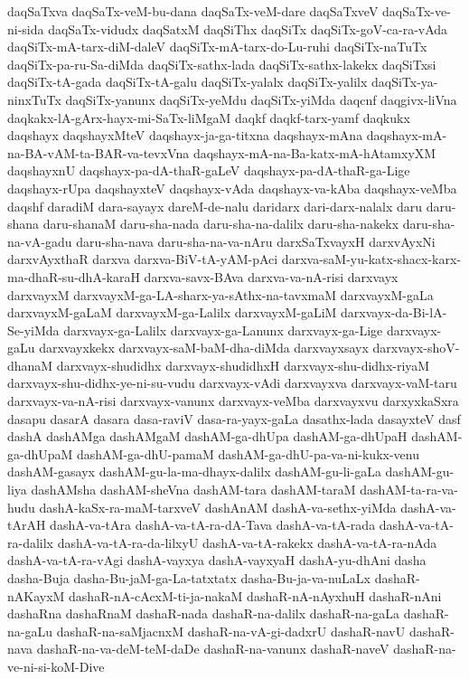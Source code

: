 {daqSaTxva
daqSaTx-veM-bu-dana
daqSaTx-veM-dare
daqSaTxveV
daqSaTx-ve-ni-sida
daqSaTx-vidudx
daqSatxM
daqSiThx
daqSiTx
daqSiTx-goV-ca-ra-vAda
daqSiTx-mA-tarx-diM-daleV
daqSiTx-mA-tarx-do-Lu-ruhi
daqSiTx-naTuTx
daqSiTx-pa-ru-Sa-diMda
daqSiTx-sathx-lada
daqSiTx-sathx-lakekx
daqSiTxsi
daqSiTx-tA-gada
daqSiTx-tA-galu
daqSiTx-yalalx
daqSiTx-yalilx
daqSiTx-ya-ninxTuTx
daqSiTx-yanunx
daqSiTx-yeMdu
daqSiTx-yiMda
daqcnf
daqgivx-liVna
daqkakx-lA-gArx-hayx-mi-SaTx-liMgaM
daqkf
daqkf-tarx-yamf
daqkukx
daqshayx
daqshayxMteV
daqshayx-ja-ga-titxna
daqshayx-mAna
daqshayx-mA-na-BA-vAM-ta-BAR-va-tevxVna
daqshayx-mA-na-Ba-katx-mA-hAtamxyXM
daqshayxnU
daqshayx-pa-dA-thaR-gaLeV
daqshayx-pa-dA-thaR-ga-Lige
daqshayx-rUpa
daqshayxteV
daqshayx-vAda
daqshayx-va-kAba
daqshayx-veMba
daqshf
daradiM
dara-sayayx
dareM-de-nalu
daridarx
dari-darx-nalalx
daru
daru-shana
daru-shanaM
daru-sha-nada
daru-sha-na-dalilx
daru-sha-nakekx
daru-sha-na-vA-gadu
daru-sha-nava
daru-sha-na-va-nAru
darxSaTxvayxH
darxvAyxNi
darxvAyxthaR
darxva
darxva-BiV-tA-yAM-pAci
darxva-saM-yu-katx-shacx-karx-ma-dhaR-su-dhA-karaH
darxva-savx-BAva
darxva-va-nA-risi
darxvayx
darxvayxM
darxvayxM-ga-LA-sharx-ya-sAthx-na-tavxmaM
darxvayxM-gaLa
darxvayxM-gaLaM
darxvayxM-ga-Lalilx
darxvayxM-gaLiM
darxvayx-da-Bi-lA-Se-yiMda
darxvayx-ga-Lalilx
darxvayx-ga-Lanunx
darxvayx-ga-Lige
darxvayx-gaLu
darxvayxkekx
darxvayx-saM-baM-dha-diMda
darxvayxsayx
darxvayx-shoV-dhanaM
darxvayx-shudidhx
darxvayx-shudidhxH
darxvayx-shu-didhx-riyaM
darxvayx-shu-didhx-ye-ni-su-vudu
darxvayx-vAdi
darxvayxva
darxvayx-vaM-taru
darxvayx-va-nA-risi
darxvayx-vanunx
darxvayx-veMba
darxvayxvu
darxyxkaSxra
dasapu
dasarA
dasara
dasa-raviV
dasa-ra-yayx-gaLa
dasathx-lada
dasayxteV
dasf
dashA
dashAMga
dashAMgaM
dashAM-ga-dhUpa
dashAM-ga-dhUpaH
dashAM-ga-dhUpaM
dashAM-ga-dhU-pamaM
dashAM-ga-dhU-pa-va-ni-kukx-venu
dashAM-gasayx
dashAM-gu-la-ma-dhayx-dalilx
dashAM-gu-li-gaLa
dashAM-gu-liya
dashAMsha
dashAM-sheVna
dashAM-tara
dashAM-taraM
dashAM-ta-ra-va-hudu
dashA-kaSx-ra-maM-tarxveV
dashAnAM
dashA-va-sethx-yiMda
dashA-va-tArAH
dashA-va-tAra
dashA-va-tA-ra-dA-Tava
dashA-va-tA-rada
dashA-va-tA-ra-dalilx
dashA-va-tA-ra-da-lilxyU
dashA-va-tA-rakekx
dashA-va-tA-ra-nAda
dashA-va-tA-ra-vAgi
dashA-vayxya
dashA-vayxyaH
dashA-yu-dhAni
dasha
dasha-Buja
dasha-Bu-jaM-ga-La-tatxtatx
dasha-Bu-ja-va-nuLaLx
dashaR-nAKayxM
dashaR-nA-cAcxM-ti-ja-nakaM
dashaR-nA-nAyxhuH
dashaR-nAni
dashaRna
dashaRnaM
dashaR-nada
dashaR-na-dalilx
dashaR-na-gaLa
dashaR-na-gaLu
dashaR-na-saMjacnxM
dashaR-na-vA-gi-dadxrU
dashaR-navU
dashaR-nava
dashaR-na-va-deM-teM-daDe
dashaR-na-vanunx
dashaR-naveV
dashaR-na-ve-ni-si-koM-Dive
}
